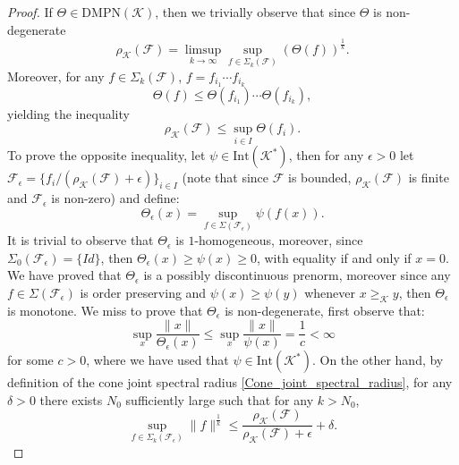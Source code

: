 \documentclass{article}
\newcommand{\family}{\mathcal{F}}
\newcommand{\cradius}{\rho_{\cone}}
\newcommand{\DMPN}{\mathrm{DMPN}}
\newcommand{\cone}{\mathcal{K}}
\newcommand{\interior}{\mathrm{Int}}
\newcommand{\cgeq}{\geq_{\cone}}
\begin{document}
    \begin{proof}
        If $\Theta\in \DMPN(\cone)$, then we trivially observe that since $\Theta$ is non-degenerate 
        \begin{equation}
            \cradius(\family)=\limsup_{k\rightarrow \infty}\sup_{f\in\Sigma_k(\family)}(\Theta(f))^{\frac{1}{k}}.
        \end{equation}
        Moreover, for any $f\in\Sigma_k(\family)$, $f=f_{i_1}\cdots f_{i_k}$
        \begin{equation}
            \Theta(f)\leq \Theta(f_{i_1})\cdots \Theta(f_{i_k}),
        \end{equation}
        yielding the inequality
        \begin{equation}
            \cradius(\family)\leq \sup_{i\in I}\Theta(f_i).
        \end{equation}
        To prove the opposite inequality, let $\psi\in \interior(\cone^*)$, then for any $\epsilon>0$ let $\family_\epsilon=\{f_i/(\cradius(\family)+\epsilon)\}_{i\in I}$ (note that since $\family$ is bounded, $\cradius(\family)$ is finite and $\family_\epsilon$ is non-zero) and define:
        \begin{equation}
            \Theta_{\epsilon}(x)=\sup_{f\in \Sigma(\family_{\epsilon})}\psi(f(x)).
        \end{equation}
        It is trivial to observe that  $\Theta_{\epsilon}$ is $1$-homogeneous, moreover, since $\Sigma_0(\family_\epsilon)=\{Id\}$, then $\Theta_{\epsilon}(x)\geq \psi(x)\geq 0$, with equality if and only if $x=0$. We have proved that $\Theta_\epsilon$ is a possibly discontinuous prenorm, moreover
        since any $f\in \Sigma(\family_\epsilon)$ is order preserving and $\psi(x)\geq \psi(y)$ whenever $x\cgeq y$, then $\Theta_\epsilon$ is monotone. We miss to prove that $\Theta_{\epsilon}$ is non-degenerate, first observe that:
        \begin{equation}
            \sup_x \frac{\|x\|}{\Theta_{\epsilon}(x)}\leq \sup_x \frac{\|x\|}{\psi(x)}=\frac{1}{c} <\infty
        \end{equation}
        for some $c>0$, where we have used that $\psi\in \interior(\cone^*)$.
        On the other hand, by definition of the cone joint spectral radius \eqref{Cone_joint_spectral_radius}, for any $\delta>0$ there exists $N_0$ sufficiently large such that for any $k>N_0$, 
        \begin{equation}        \sup_{f\in\Sigma_k(\family_\epsilon)}\|f\|^{\frac{1}{k}}\leq \frac{\cradius(\family)}{\cradius(\family)+\epsilon}+\delta.

\end{equation}
\end{proof}
\end{document}
